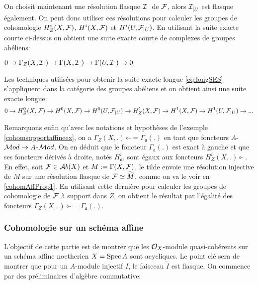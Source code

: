 On choisit maintenant une résolution flasque $\mathcal{I}^.$ de $\mathcal{F}$, alors $\mathcal{I}^._{|U}$ est flasque également. On peut donc utiliser ces résolutions pour calculer les groupes de cohomologie $H_Z^i(X,\mathcal{F})$, $H^i(X,\mathcal{F})$ et $H^i(U,\mathcal{F}_{|U})$. En utilisant la suite exacte courte ci-dessus on obtient une suite exacte courte de complexes de groupes abéliens:

\begin{center}
$0\rightarrow \Gamma_Z(X,\mathcal{I}^.)\rightarrow \Gamma(X,\mathcal{I}^.)\rightarrow \Gamma(U,\mathcal{I}^.)\rightarrow 0$
\end{center}

Les techniques utilisées pour obtenir la suite exacte longue \ref{eq:longSES} s'appliquent dans la catégorie des groupes abéliens et on obtient ainsi une suite exacte longue:
\begin{equation}\label{eq:longSESSupport}
0\rightarrow H_Z^0(X,\mathcal{F})\rightarrow H^0(X,\mathcal{F})\rightarrow H^0(U,\mathcal{F}_{|U})\rightarrow  H_Z^1(X,\mathcal{F})\rightarrow H^1(X,\mathcal{F})\rightarrow H^1(U,\mathcal{F}_{|U})\rightarrow ...
\end{equation}


Remarquons enfin qu'avec les notations et hypothèses de l'exemple \ref{cohomsupportaffineex}, on a $\Gamma_Z(X, .)\circ\, \widetilde{}=\Gamma_\mathfrak{a}(.)$ en tant que foncteurs $A$-$\mathcal{M} od\rightarrow A$-$\mathcal{M} od$. On en déduit que le foncteur $\Gamma_\mathfrak{a}(.)$ est exact à gauche et que ses foncteurs dérivés à droite, notés $H_\mathfrak{a}^i$, sont égaux aux foncteurs $H_Z^i(X,.)\circ \widetilde{}$ . En effet, soit $\mathcal{F} \in \mathcal{A} b(X)$ et $M:=\Gamma(X,\mathcal{F})$, le tilde envoie une résolution injective de $M$ sur une résolution flasque de $\mathcal{F}\simeq \widetilde{M}$, comme on va le voir en \ref{cohomAffProp1}. En utilisant cette dernière pour calculer les groupes de cohomologie de $\mathcal{F}$ à support dans $Z$, on obtient le résultat par l'égalité des foncteurs $\Gamma_Z(X, .)\circ\, \widetilde{}=\Gamma_\mathfrak{a}(.)$.

\subsubsection{Cohomologie sur un schéma affine}

L'objectif de cette partie est de montrer que les $\mathcal{O}_X$-module quasi-cohérents sur un schéma affine noetherien $X=\operatorname{Spec} A$ sont acycliques. Le point clé sera de montrer que pour un $A$-module injectif $I$, le faisceau $\widetilde{I}$ est flasque. On commence par des préliminaires d'algèbre commutative:


